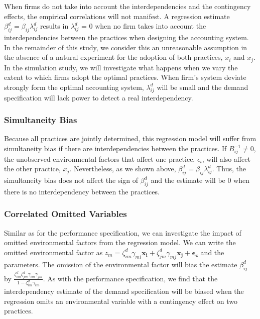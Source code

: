 \documentclass[12pt]{article}
\begin{document}
When firms do not take into account the interdependencies and the contingency effects, the empirical correlations will not manifest. A regression estimate $\beta^d_{ij} = \beta_{ij} \lambda^d_{ij}$ results in $\lambda^d_{ij}$ = 0 when no firm takes into account the interdependencies between the practices when designing the accounting system. In the remainder of this study, we consider this an unreasonable  assumption in the absence of a natural experiment for the adoption of both practices, $x_i$ and $x_j$. In the simulation study, we will investigate what happens when we vary the extent to which firms adopt the optimal practices. When firm's system deviate strongly form the optimal accounting system, $\lambda^d_{ij}$ will be small and the demand specification will lack power to detect a real interdependency.

\subsubsection{Simultaneity Bias}

Because all practices are jointly determined, this regression model will suffer from simultaneity bias \citep{Chenhall2007} if there are interdependencies between the practices. If $B^{-1}_{ij} \neq 0$, the unobserved environmental factors that affect one practice, $\epsilon_i$, will also affect the other practice, $x_j$. Nevertheless, as we shown above, $\beta^d_{ij} = \beta_{ij} \lambda^d_{ij}$. Thus, the simultaneity bias does not affect the sign of $\beta^d_{ij}$ and the estimate will be 0 when there is no interdependency between the practices. 

\subsubsection{Correlated Omitted Variables}

Similar as for the performance specification, we can investigate the impact of omitted environmental factors from the regression model. We can write the omitted environmental factor as $z_m = \zeta_{im}^d \gamma_{mi} \mathbf{x_i} +  \zeta_{jm}^d \gamma_{mj} \mathbf{x_j} + \mathbf{\epsilon_z}$ and the parameters. The omission of the environmental factor will bias the estimate $\beta^d_{ij}$ by $\frac{\zeta^d_{im} \zeta^d_ {jm}\gamma_{im} \gamma_{jm}}{1 - \zeta^d_{im} \gamma_{im}}$. As with the performance specification, we find that the interdependency estimate of the demand specification will be biased when the regression omits an environmental variable with a contingency effect on two practices.
\end{document}
